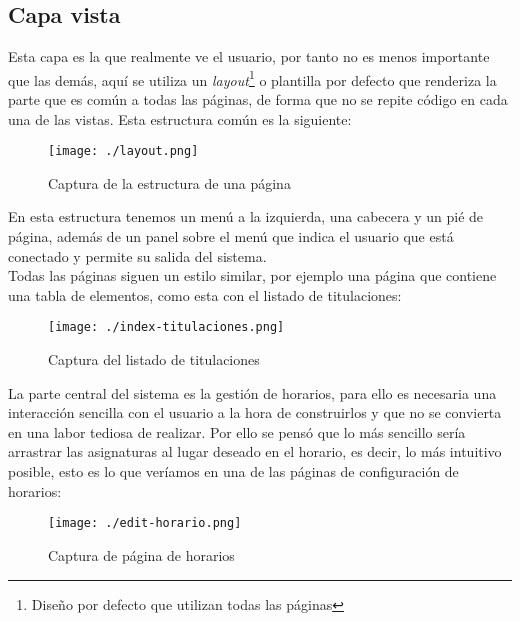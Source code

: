 \subsection{Capa vista}

Esta capa es la que realmente ve el usuario, por tanto no es menos importante que las demás, aquí se utiliza un {\em layout}\footnote{Diseño por defecto que utilizan todas las páginas} o plantilla por defecto que renderiza la parte que es común a todas las páginas, de forma que no se repite código en cada una de las vistas. Esta estructura común es la siguiente:

\begin{figure}[H] 
  \label{captura-layout} 
	\begin{center}
    \texttt{[image: ./layout.png]}
  \end{center}
\caption{Captura de la estructura de una página}
\end{figure}

En esta estructura tenemos un menú a la izquierda, una cabecera y un pié de página, además de un panel sobre el menú que indica el usuario que está conectado y permite su salida del sistema.\\

Todas las páginas siguen un estilo similar, por ejemplo una página que contiene una tabla de elementos, como esta con el listado de titulaciones:

\begin{figure}[H] 
  \label{captura-index-titulaciones} 
	\begin{center}
    \texttt{[image: ./index-titulaciones.png]}
  \end{center}
\caption{Captura del listado de titulaciones}
\end{figure}

La parte central del sistema es la gestión de horarios, para ello es necesaria una interacción sencilla con el usuario a la hora de construirlos y que no se convierta en una labor tediosa de realizar. Por ello se pensó que lo más sencillo sería arrastrar las asignaturas al lugar deseado en el horario, es decir, lo más intuitivo posible, esto es lo que veríamos en una de las páginas de configuración de horarios:

\begin{figure}[H] 
  \label{captura-horarios} 
	\begin{center}
    \texttt{[image: ./edit-horario.png]}
  \end{center}
\caption{Captura de página de horarios}
\end{figure}

